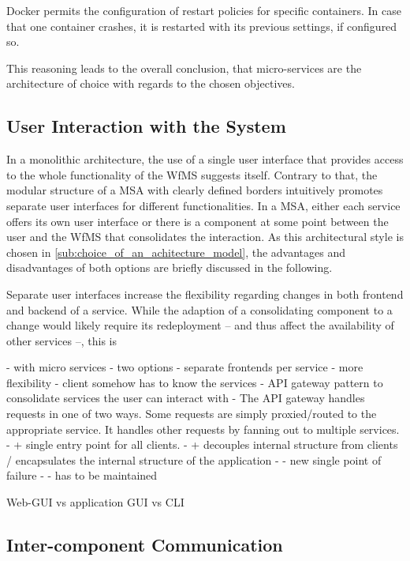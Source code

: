   Docker permits the configuration of restart policies for specific containers. In case that one container crashes, it is restarted with its previous settings, if configured so.

  This reasoning leads to the overall conclusion, that micro-services are the architecture of choice with regards to the chosen objectives.

\subsection{User Interaction with the System} %
\label{sub:user_interaction_with_the_system}
  In a monolithic architecture, the use of a single user interface that provides access to the whole functionality of the \ac{WfMS} suggests itself.
  Contrary to that, the modular structure of a \ac{MSA} with clearly defined borders intuitively promotes separate user interfaces for different functionalities.
  In a \ac{MSA}, either each service offers its own user interface or there is a component at some point between the user and the \ac{WfMS} that consolidates the interaction. As this architectural style is chosen in \ref{sub:choice_of_an_achitecture_model}, the advantages and disadvantages of both options are briefly discussed in the following.

  Separate user interfaces increase the flexibility regarding changes in both frontend and backend of a service. While the adaption of a consolidating component to a change would likely require its redeployment -- and thus affect the availability of other services --, this is

  - with micro services
    - two options
      - separate frontends per service
        - more flexibility
        - client somehow has to know the services
      - API gateway pattern to consolidate  services the user can interact with
        - The API gateway handles requests in one of two ways. Some requests are simply proxied/routed to the appropriate service. It handles other requests by fanning out to multiple services.
        - + single entry point for all clients.
        - + decouples internal structure from clients / encapsulates the internal structure of the application
        - - new single point of failure
        - - has to be maintained


  Web-GUI vs application GUI vs CLI

\subsection{Inter-component Communication} %
\label{sub:inter_component_communication}


